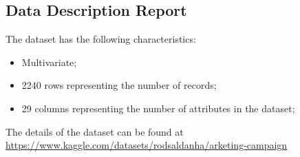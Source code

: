 \subsection{Data Description Report}

The dataset has the following characteristics: 
\begin{itemize}
    \item Multivariate;
    \item 2240 rows representing the number of records;
    \item 29 columns representing the number of attributes in the dataset;
\end{itemize}

The details of the dataset can be found at \href{kaggle}{https://www.kaggle.com/datasets/rodsaldanha/arketing-campaign}

